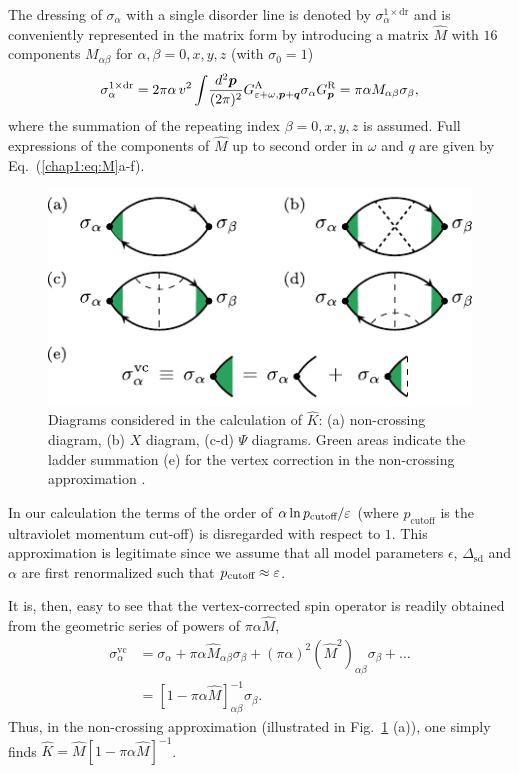 The dressing of $\sigma_\alpha$ with a single disorder line is denoted by $\sigma_\alpha^{1\times\text{dr}}$ and is conveniently represented in the matrix form by introducing a matrix $\hat{M}$ with $16$ components $M_{\alpha\beta}$ for $\alpha,\beta=0,x,y,z$ (with $\sigma_0=1$)
    \begin{align}
       \sigma_\alpha^{1\times\text{dr}}  = 2\pi \alpha\, v^2 \int\!\frac{d^2\boldsymbol{p}}{(2\pi)^2} G^\text{A}_{\varepsilon+\omega,\boldsymbol{p}+\boldsymbol{q}}\sigma_\alpha G^\text{R}_{\boldsymbol{p}} = \pi\alpha M_{\alpha\beta}\sigma_\beta,
        \label{chap1:eq:myseries}
    \end{align}
where the summation of the repeating index $\beta=0,x,y,z$ is assumed. Full expressions of the components of $\hat{M}$ up to second order in $\omega$ and $q$ are given by Eq.~(\ref{chap1:eq:M}a-f). 
\begin{figure}[t]
\centering
\includegraphics[]{articles/dirac_fm/fig2}
\caption{Diagrams considered in the calculation of $\hat{K}$: (a) non-crossing diagram, (b) $X$ diagram, (c-d) $\Psi$ diagrams. Green areas indicate the ladder summation (e) for the vertex correction in the non-crossing approximation \cite{ivanEPL}.}
\label{fig:diagrams}
\end{figure}

In our calculation the terms of the order of $\alpha \ln p_\textrm{cutoff}/\varepsilon$ (where $p_\textrm{cutoff}$ is the ultraviolet momentum cut-off) is disregarded with respect to $1$. This approximation is legitimate since we assume that all model parameters $\epsilon$, $\Delta_\textrm{sd}$ and $\alpha$ are first renormalized such that $p_\textrm{cutoff} \approx \varepsilon$.

It is, then, easy to see that the vertex-corrected spin operator is readily obtained from the geometric series of powers of $\pi\alpha \hat{M}$, 
\begin{align}
\sigma_\alpha^\text{vc} &= 
\sigma_\alpha+\pi\alpha \hat{M}_{\alpha\beta}\sigma_\beta+(\pi\alpha)^2 (\hat{M}^2)_{\alpha\beta}\sigma_\beta+\dots\nonumber\\
&=\left[1-\pi\alpha \hat{M}\right]^{-1}_{\alpha\beta}\sigma_\beta.
\end{align}
Thus, in the non-crossing approximation (illustrated in Fig.~\ref{fig:diagrams} (a)), one simply finds $\hat{K}= \hat{M}[1-\pi\alpha \hat{M}]^{-1}$. 

